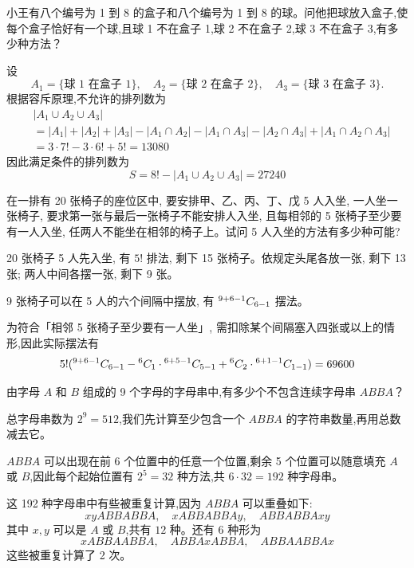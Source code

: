 \begin{questions}
    \question 小王有八个编号为 1 到 8 的盒子和八个编号为 1 到 8 的球。问他把球放入盒子,使每个盒子恰好有一个球,且球 1 不在盒子 1,球 2 不在盒子 2,球 3 不在盒子 3,有多少种方法？
    \begin{solution}
        设
        \[
        A_1 = \{\text{球 1 在盒子 1}\}, \quad
        A_2 = \{\text{球 2 在盒子 2}\}, \quad
        A_3 = \{\text{球 3 在盒子 3}\}.
        \]
        根据容斥原理,不允许的排列数为
        \begin{align}
        &|A_1 \cup A_2 \cup A_3| \\
        &= |A_1| + |A_2| + |A_3| - |A_1 \cap A_2| - |A_1 \cap A_3| - |A_2 \cap A_3| + |A_1 \cap A_2 \cap A_3| \\
        &=3\cdot 7! - 3\cdot 6! + 5! = 13080           
        \end{align}
        因此满足条件的排列数为
        \[
        S = 8! - |A_1 \cup A_2 \cup A_3| = 27240
        \]
    \end{solution}

    \question 在一排有 20 张椅子的座位区中, 要安排甲、乙、丙、丁、戊 5 人入坐, 一人坐一张椅子, 要求第一张与最后一张椅子不能安排人入坐, 且每相邻的 5 张椅子至少要有一人入坐, 任两人不能坐在相邻的椅子上。试问 5 人入坐的方法有多少种可能?
    \begin{solution}
    20 张椅子 5 人先入坐, 有 $5!$ 排法, 剩下 15 张椅子。依规定头尾各放一张, 剩下 13 张; 两人中间各摆一张, 剩下 9 张。

    9 张椅子可以在 5 人的六个间隔中摆放, 有 ${}^{9+6-1}C_{6-1}$ 摆法。

    为符合「相邻 5 张椅子至少要有一人坐」, 需扣除某个间隔塞入四张或以上的情形,因此实际摆法有
    \[
    5!({}^{9+6-1}C_{6-1} - {}^{6}C_{1} \cdot {}^{6+5-1}C_{5-1} + {}^{6}C_{2} \cdot {}^{6+1-1}C_{1-1})= 69600
    \]
    \end{solution}

    \question 由字母 $A$ 和 $B$ 组成的 9 个字母的字母串中,有多少个不包含连续字母串 $ABBA$？
    \begin{solution}
        总字母串数为 $2^9 = 512$,我们先计算至少包含一个 $ABBA$ 的字符串数量,再用总数减去它。

        $ABBA$ 可以出现在前 6 个位置中的任意一个位置,剩余 5 个位置可以随意填充 $A$ 或 $B$,因此每个起始位置有 $2^5 = 32$ 种方法,共 $6 \cdot 32 = 192$ 种字母串。  

        这 192 种字母串中有些被重复计算,因为 $ABBA$ 可以重叠如下:
        \[
        xyABBABBA, \quad xABBABBAy, \quad ABBABBAxy
        \]
        其中 $x, y$ 可以是 $A$ 或 $B$,共有 $12$ 种。还有 6 种形为
        \[
        xABBAABBA, \quad ABBAxABBA, \quad ABBAABBAx
        \]
        这些被重复计算了 2 次。  


\end{solution}
\end{questions}
